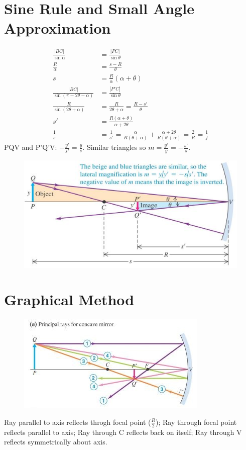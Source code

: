 \documentclass[a4paper, 11pt, normalem]{report}
\begin{document}
\section{Sine Rule and Small Angle Approximation}
\begin{align}
    \frac{|BC|}{\sin{\alpha}} &= \frac{|PC|}{\sin{\theta}} \\
    \frac{R}{\alpha} &= \frac{s - R}{\theta} \\
    s &= \frac{R}{\alpha}(\alpha + \theta) \\
    \frac{|BC|}{\sin{(\pi - 2\theta - \alpha)}} &= \frac{|P'C|}{\sin{\theta}}\\
    \frac{R}{\sin{(2\theta + \alpha)}} &= \frac{R}{2\theta + \alpha} = \frac{R - s'}{\theta} \\
    s' &= \frac{R(\alpha + \theta)}{\alpha + 2\theta} \\
    \frac{1}{s} &= \frac{1}{s'} = \frac{\alpha}{R(\theta + \alpha)} + \frac{\alpha + 2\theta}{R(\theta + \alpha)} = \frac{2}{R} = \frac{1}{f}
\end{align}
PQV and P'Q'V: $-\frac{y'}{s'} = \frac{y}{s}$.
Similar triangles so $m = \frac{y'}{y} = -\frac{s'}{s}$.
\begin{figure}[H]
    \centering
    \includegraphics[scale=0.8]{Reflect1.jpg}
\end{figure}

\section{Graphical Method}
\begin{figure}[H]
    \centering
    \includegraphics{Reflect2.jpg} 
\end{figure}
Ray parallel to axis reflects throgh focal point ($\frac{R}{2}$); Ray through focal point reflects parallel to axis; Ray through C reflects back on itself; Ray through V reflects symmetrically about axis.
\end{document}
